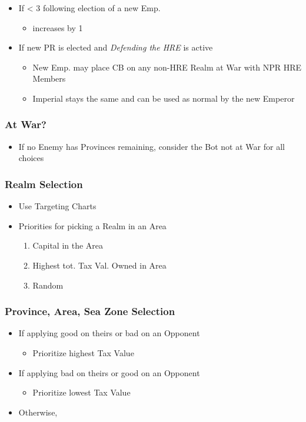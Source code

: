 \documentclass[10pt]{article}
\begin{document}
\begin{itemize}
\begin{itemize}
	\end{itemize}
	\item If \authority < 3 following election of a new Emp.
	\begin{itemize}
		\item \authority increases by 1
	\end{itemize}
	\item If new PR is elected and \emph{Defending the HRE} is active
	\begin{itemize}
		\item New Emp. may place CB on any non-HRE Realm at War with NPR HRE Members
		\item Imperial \manpower stays the same and can be used as normal by the new Emperor
	\end{itemize}
\end{itemize}


\botrules %

\subsubsection*{At War?}
\begin{itemize}
	\item If no Enemy has Provinces remaining, consider the Bot not at War for all choices
\end{itemize}

\subsubsection*{Realm Selection}
\begin{itemize}
	\item Use Targeting Charts
	\item Priorities for picking a Realm in an Area
	\begin{enumerate}
		\item Capital in the Area
		\item Highest tot. Tax Val. Owned in Area
		\item Random
	\end{enumerate}
\end{itemize}

\subsubsection*{Province, Area, Sea Zone Selection}
\begin{itemize}
	\item If applying good on theirs or bad on an Opponent
	\begin{itemize}
		\item Prioritize highest Tax Value
	\end{itemize}
	\item If applying bad on theirs or good on an Opponent
	\begin{itemize}
		\item Prioritize lowest Tax Value
	\end{itemize}
	\item Otherwise, \az
\end{itemize}
\end{document}
